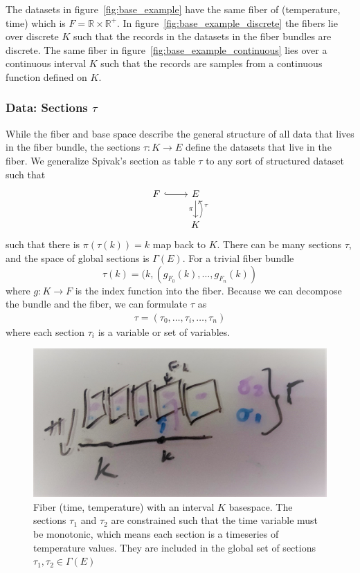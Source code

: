 \documentclass[../main.tex]{subfiles}
\begin{document}
The datasets in figure~\ref{fig:base_example} have the same fiber of (temperature, time) which is $F=\mathbb{R}\times \mathbb{R}^+$. In figure~\ref{fig:base_example_discrete} the fibers lie over discrete $K$ such that the records in the datasets in the fiber bundles are discrete. The same fiber in figure~\ref{fig:base_example_continuous} lies over a continuous interval $K$ such that the records are samples from a continuous function defined on $K$.

\subsubsection{Data: Sections $\tau$}
\label{sec:data_section}
While the fiber and base space describe the general structure of all data that lives in the fiber bundle, the sections $\tau: K\rightarrow E$ define the datasets that live in the fiber. We generalize Spivak's section as table $\tau$\cite{spivakSIMPLICIALDATABASES} to any sort of structured dataset such that 
\begin{equation}
    \begin{tikzcd}
        F \arrow[r, hook] & E \arrow[d, "\pi"']              \\
                          & K \arrow[u, "\tau"', bend right]
    \end{tikzcd}
\end{equation}
such that there is $\pi(\tau(k)) = k$ map back to $K$. There can be many sections $\tau$, and the space of global sections is $\Gamma(E)$. For a trivial fiber bundle
\begin{equation}
    \label{eq:section_return}
    \tau(k) = (k, (g_{F_{0}}(k), \ldots, g_{F_{n}}(k))
\end{equation}
where $g: K \rightarrow F$ is the index function into the fiber. Because we can decompose the bundle and the fiber, we can formulate $\tau$ as 
\begin{align}
\tau = (\tau_0,\ldots, \tau_i, \dots, \tau_n) 
\end{align}
where each section $\tau_i$ is a variable or set of variables. 

\begin{figure}[H]
    \includegraphics[width=.5\linewidth]{figures/math/fiberbundle.png}
    \caption{ Fiber (time, temperature) with an interval $K$ basespace. The sections $\tau_1$ and $\tau_2$ are constrained such that the time variable must be monotonic, which means each section is a timeseries of temperature values. They are included in the global set of sections  $\tau_1, \tau_2 \in \Gamma(E)$}
    \label{fig:data_sections}
\end{figure}
\end{document}
